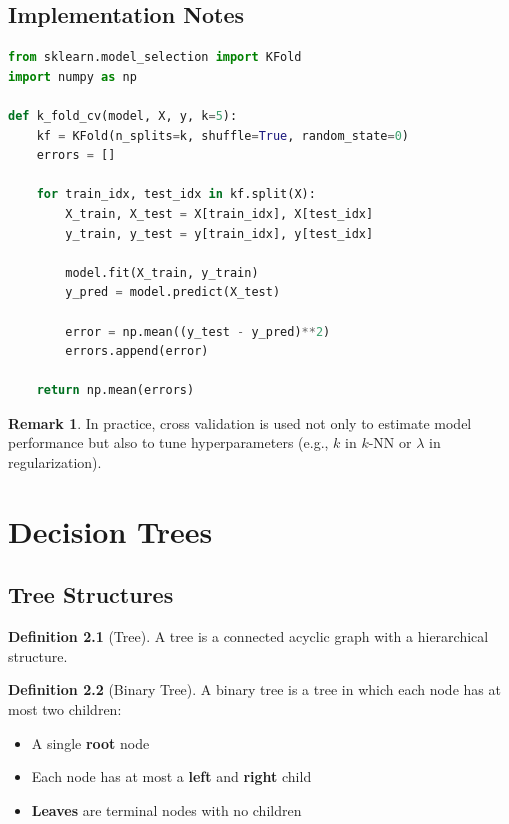 \documentclass[12pt,oneside]{book}
\numberwithin{equation}{section}
\theoremstyle{definition}
\newtheorem{definition}{Definition}[section]
\newtheorem{remark}{Remark}[section]
\theoremstyle{plain}
\theoremstyle{remark}
\begin{document}
\section{Implementation Notes}

\begin{lstlisting}[language=Python]
from sklearn.model_selection import KFold
import numpy as np

def k_fold_cv(model, X, y, k=5):
    kf = KFold(n_splits=k, shuffle=True, random_state=0)
    errors = []

    for train_idx, test_idx in kf.split(X):
        X_train, X_test = X[train_idx], X[test_idx]
        y_train, y_test = y[train_idx], y[test_idx]

        model.fit(X_train, y_train)
        y_pred = model.predict(X_test)

        error = np.mean((y_test - y_pred)**2)
        errors.append(error)

    return np.mean(errors)
\end{lstlisting}

\begin{remark}
In practice, cross validation is used not only to estimate model performance but also to tune hyperparameters (e.g., $k$ in $k$-NN or $\lambda$ in regularization).
\end{remark}

\chapter{Decision Trees}

\section{Tree Structures}

\begin{definition}[Tree]
A tree is a connected acyclic graph with a hierarchical structure.
\end{definition}

\begin{definition}[Binary Tree]
A binary tree is a tree in which each node has at most two children:
\begin{itemize}
    \item A single \textbf{root} node
    \item Each node has at most a \textbf{left} and \textbf{right} child
    \item \textbf{Leaves} are terminal nodes with no children
\end{itemize}
\end{definition}
\end{document}
